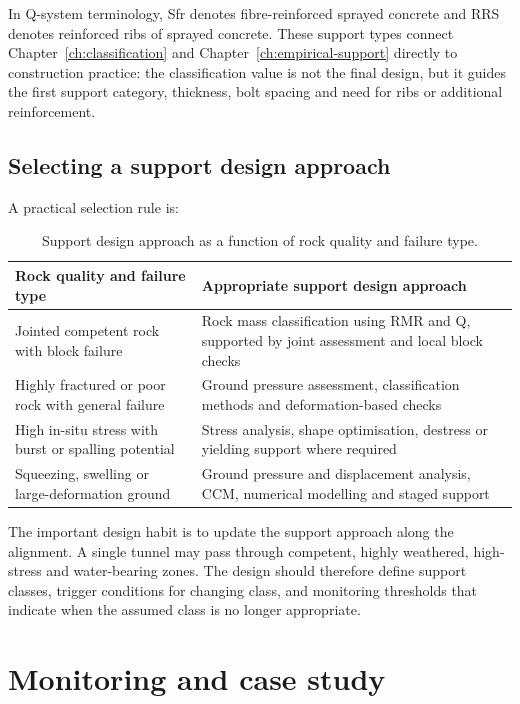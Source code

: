 In Q-system terminology, Sfr denotes fibre-reinforced sprayed concrete and RRS denotes reinforced ribs of sprayed concrete. These support types connect Chapter~\ref{ch:classification} and Chapter~\ref{ch:empirical-support} directly to construction practice: the classification value is not the final design, but it guides the first support category, thickness, bolt spacing and need for ribs or additional reinforcement.

\subsection{Selecting a support design approach}
\label{sec:support-approach-selection}
A practical selection rule is:

\begin{table}[H]
\centering
\small
\begin{tabularx}{\textwidth}{p{} X}
\toprule
\textbf{Rock quality and failure type} & \textbf{Appropriate support design approach} \\
\midrule
Jointed competent rock with block failure & Rock mass classification using RMR and Q, supported by joint assessment and local block checks \\
Highly fractured or poor rock with general failure & Ground pressure assessment, classification methods and deformation-based checks \\
High in-situ stress with burst or spalling potential & Stress analysis, shape optimisation, destress or yielding support where required \\
Squeezing, swelling or large-deformation ground & Ground pressure and displacement analysis, CCM, numerical modelling and staged support \\
\bottomrule
\end{tabularx}
\caption{Support design approach as a function of rock quality and failure type.}
\label{tab:ch10-support-selection}
\end{table}

The important design habit is to update the support approach along the alignment. A single tunnel may pass through competent, highly weathered, high-stress and water-bearing zones. The design should therefore define support classes, trigger conditions for changing class, and monitoring thresholds that indicate when the assumed class is no longer appropriate.

\section{Monitoring and case study}
\label{sec:monitoring-and-case-study}

